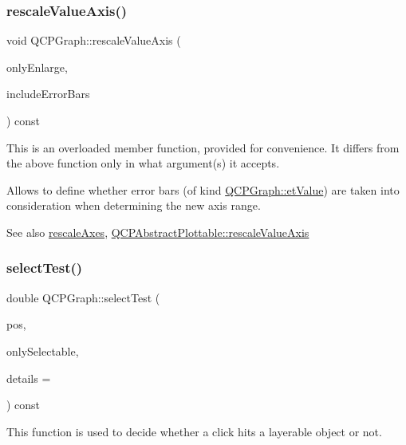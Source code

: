 \subsubsection{\texorpdfstring{rescale\+Value\+Axis()}{rescaleValueAxis()}\hspace{0.1cm}{\footnotesize\ttfamily [2/2]}}
{\footnotesize\ttfamily void Q\+C\+P\+Graph\+::rescale\+Value\+Axis (\begin{DoxyParamCaption}\item[{bool}]{only\+Enlarge,  }\item[{bool}]{include\+Error\+Bars }\end{DoxyParamCaption}) const}

This is an overloaded member function, provided for convenience. It differs from the above function only in what argument(s) it accepts.

Allows to define whether error bars (of kind \mbox{\hyperlink{class_q_c_p_graph_ad23b514404bd2cb3216f57c90904d6afa147022ccdc49f6bd48f904cb4f61872e}{Q\+C\+P\+Graph\+::et\+Value}}) are taken into consideration when determining the new axis range.

\begin{DoxySeeAlso}{See also}
\mbox{\hyperlink{class_q_c_p_graph_a9c3909d6116e9d03978f057d41174e6a}{rescale\+Axes}}, \mbox{\hyperlink{class_q_c_p_abstract_plottable_aa1e408bb2d13999150c3f7f8a8579ca9}{Q\+C\+P\+Abstract\+Plottable\+::rescale\+Value\+Axis}} 
\end{DoxySeeAlso}
\mbox{\label{class_q_c_p_graph_a36011c34aca4f7a477de25961e2f6c13}} 
\subsubsection{\texorpdfstring{select\+Test()}{selectTest()}}
{\footnotesize\ttfamily double Q\+C\+P\+Graph\+::select\+Test (\begin{DoxyParamCaption}\item[{const Q\+PointF \&}]{pos,  }\item[{bool}]{only\+Selectable,  }\item[{Q\+Variant $\ast$}]{details = {} }\end{DoxyParamCaption}) const\hspace{0.3cm}{\ttfamily [virtual]}}

This function is used to decide whether a click hits a layerable object or not.

